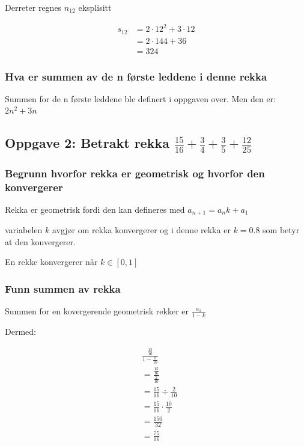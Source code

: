 \documentclass{article}
\begin{document}
Derreter regnes $n_{12}$ eksplisitt

\begin{align*}
    s_{12} &= 2 \cdot 12^2 + 3 \cdot 12 \\
    &= 2 \cdot 144 + 36 \\
    &= 324
\end{align*}

\subsubsection{Hva er summen av de n første leddene i denne rekka}

Summen for de n første leddene ble definert i oppgaven over. Men den er: $2n^2 + 3n$

\subsection{Oppgave 2: Betrakt rekka $\frac{15}{16} + \frac{3}{4} + \frac{3}{5} + \frac{12}{25}$}

\subsubsection{Begrunn hvorfor rekka er geometrisk og hvorfor den konvergerer}

Rekka er geometrisk fordi den kan defineres med $a_{n+1}=a_n k + a_1$

variabelen $k$ avgjør om rekka konvergerer og i denne rekka er $k=0.8$ som betyr at den konvergerer.

En rekke konvergerer når $k \in [0, 1]$

\subsubsection{Funn summen av rekka}

Summen for en kovergerende geometrisk rekker er $\frac{a_1}{1-k}$

Dermed:

\begin{align*}
    & \frac{\frac{15}{16}}{1-\frac{8}{10}} \\
    &= \frac{\frac{15}{16}}{\frac{2}{10}} \\ 
    &= \frac{15}{16} \div \frac{2}{10} \\
    &= \frac{15}{16} \cdot \frac{10}{2} \\
    &= \frac{150}{32} \\
    &= \frac{75}{16}
\end{align*}
\end{document}
